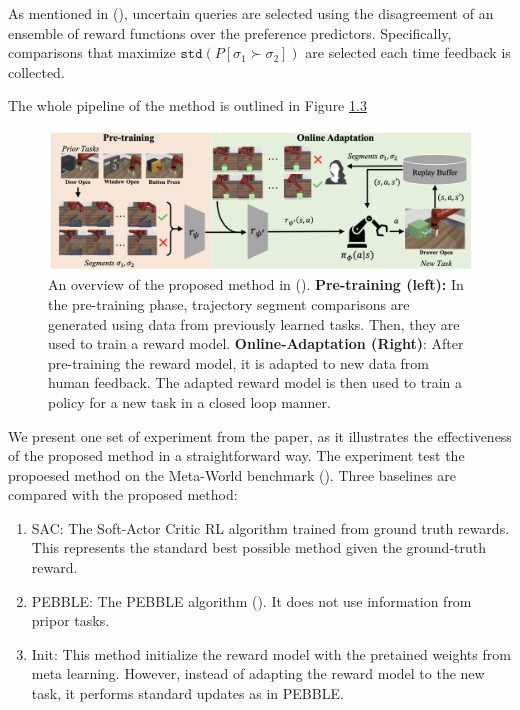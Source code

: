 \documentclass[
  letterpaper,
  DIV=11,
  numbers=noendperiod,
  oneside]{scrreprt}
\theoremstyle{remark}
\begin{document}
As mentioned in (), uncertain queries are selected using the disagreement of an
ensemble of reward functions over the preference predictors.
Specifically, comparisons that maximize
\(\texttt{std}(P[\sigma_1 \succ \sigma_2])\) are selected each time
feedback is collected.

The whole pipeline of the method is outlined in Figure
\hyperref[fig:few-1]{1.3}

\begin{figure}

{\centering \includegraphics{src/Figures/overview-few.png}

}

\caption{An overview of the proposed method in
().
\textbf{Pre-training (left):} In the pre-training phase, trajectory
segment comparisons are generated using data from previously learned
tasks. Then, they are used to train a reward model.
\textbf{Online-Adaptation (Right)}: After pre-training the reward model,
it is adapted to new data from human feedback. The adapted reward model
is then used to train a policy for a new task in a closed loop manner.}

\end{figure}%

We present one set of experiment from the paper, as it illustrates the
effectiveness of the proposed method in a straightforward way. The
experiment test the propoesed method on the Meta-World benchmark
(). Three baselines are
compared with the proposed method:

\begin{enumerate}
\def\labelenumi{\arabic{enumi}.}
\item
  SAC: The Soft-Actor Critic RL algorithm trained from ground truth
  rewards. This represents the standard best possible method given the
  ground-truth reward.
\item
  PEBBLE: The PEBBLE algorithm (). It does not use information from pripor tasks.
\item
  Init: This method initialize the reward model with the pretained
  weights from meta learning. However, instead of adapting the reward
  model to the new task, it performs standard updates as in PEBBLE.
\end{enumerate}
\end{document}
